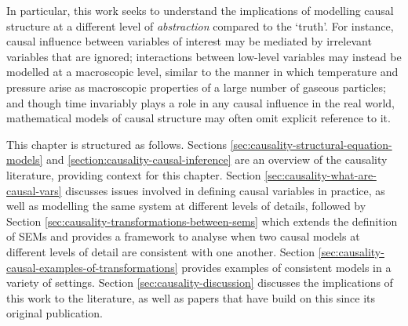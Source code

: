 In particular, this work seeks to understand the implications of modelling causal structure at a different level of \emph{abstraction} compared to the `truth'. For instance, causal influence between variables of interest may be mediated by irrelevant variables that are ignored; interactions between low-level variables may instead be modelled at a macroscopic level, similar to the manner in which temperature and pressure arise as macroscopic properties of a large number of gaseous particles; and though time invariably plays a role in any causal influence in the real world, mathematical models of causal structure may often omit explicit reference to it.

This chapter is structured as follows.
Sections \ref{sec:causality-structural-equation-models} and \ref{section:causality-causal-inference} are an overview of the causality literature, providing context for this chapter.
Section \ref{sec:causality-what-are-causal-vars} discusses issues involved in defining causal variables in practice, as well as modelling the same system at different levels of details,
followed by Section \ref{sec:causality-transformations-between-sems} which extends the definition of SEMs and provides a framework to analyse when two causal models at different levels of detail are consistent with one another.
Section \ref{sec:causality-causal-examples-of-transformations} provides examples of consistent models in a variety of settings.
Section \ref{sec:causality-discussion} discusses the implications of this work to the literature, as well as papers that have build on this since its original publication. 







